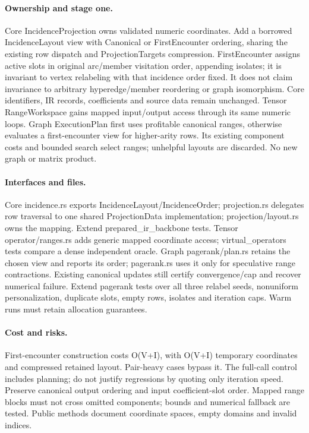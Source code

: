 \documentclass[11pt,a4paper]{article}
\begin{document}
\paragraph{Ownership and stage one.} Core IncidenceProjection owns validated numeric
coordinates. Add a borrowed IncidenceLayout view with Canonical or FirstEncounter
ordering, sharing the existing row dispatch and ProjectionTargets compression.
FirstEncounter assigns active slots in original arc/member visitation order, appending
isolates; it is invariant to vertex relabeling with that incidence order fixed. It does
not claim invariance to arbitrary hyperedge/member reordering or graph isomorphism.
Core identifiers, IR records, coefficients and source data remain unchanged.
Tensor RangeWorkspace gains mapped input/output access through its same numeric loops.
Graph ExecutionPlan first uses profitable canonical ranges, otherwise evaluates a
first-encounter view for higher-arity rows. Its existing component costs and bounded
search select ranges; unhelpful layouts are discarded. No new graph or matrix product.
\paragraph{Interfaces and files.} Core incidence.rs exports IncidenceLayout/IncidenceOrder;
projection.rs delegates row traversal to one shared ProjectionData implementation;
projection/layout.rs owns the mapping. Extend prepared\_ir\_backbone tests. Tensor
operator/ranges.rs adds generic mapped coordinate access; virtual\_operators tests
compare a dense independent oracle. Graph pagerank/plan.rs retains the chosen view and
reports its order; pagerank.rs uses it only for speculative range contractions.
Existing canonical updates still certify convergence/cap and recover numerical failure.
Extend pagerank tests over all three relabel seeds, nonuniform personalization, duplicate
slots, empty rows, isolates and iteration caps. Warm runs must retain allocation guarantees.
\paragraph{Cost and risks.} First-encounter construction costs O(V+I), with O(V+I)
temporary coordinates and compressed retained layout. Pair-heavy cases bypass it.
The full-call control includes planning; do not justify regressions by quoting only
iteration speed. Preserve canonical output ordering and input coefficient-slot order.
Mapped range blocks must not cross omitted components; bounds and numerical fallback
are tested. Public methods document coordinate spaces, empty domains and invalid indices.
\end{document}
